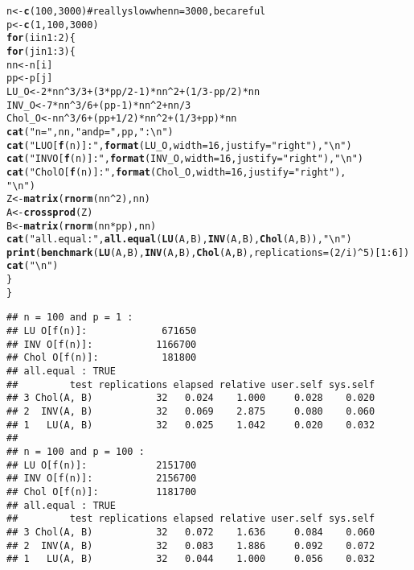 \documentclass{article}\usepackage{graphicx, color}
\makeatletter
\newcommand{\hlfunctioncall}[1]{\textcolor[rgb]{0.501960784313725,0,0.329411764705882}{\textbf{#1}}}%
\newcommand{\hlstring}[1]{\textcolor[rgb]{0.6,0.6,1}{#1}}%
\newcommand{\hlcomment}[1]{\textcolor[rgb]{0.180392156862745,0.6,0.341176470588235}{#1}}%
\newenvironment{kframe}{%
 \def\at@end@of@kframe{}%
 \ifinner\ifhmode%
  \def\at@end@of@kframe{\end{minipage}}%
  \begin{minipage}{\columnwidth}%
 \fi\fi%
 \def\FrameCommand##1{\hskip\@totalleftmargin \hskip-\fboxsep
 \colorbox{shadecolor}{##1}\hskip-\fboxsep
     \hskip-\linewidth \hskip-\@totalleftmargin \hskip\columnwidth}%
 \MakeFramed {\advance\hsize-\width
   \@totalleftmargin\z@ \linewidth\hsize
   \@setminipage}}%
 {\par\unskip\endMakeFramed%
 \at@end@of@kframe}
\newenvironment{knitrout}{}{} %
\makeatother
\begin{document}
\begin{knitrout}
\begin{kframe}
\begin{alltt}
n <- \hlfunctioncall{c}(100, 3000)  \hlcomment{# really slow when n=3000, be careful}
p <- \hlfunctioncall{c}(1, 100, 3000)
\hlfunctioncall{for} (i in 1:2) \{
    \hlfunctioncall{for} (j in 1:3) \{
        nn <- n[i]
        pp <- p[j]
        LU_O <- 2 * nn^3/3 + (3 * pp/2 - 1) * nn^2 + (1/3 - pp/2) * nn
        INV_O <- 7 * nn^3/6 + (pp - 1) * nn^2 + nn/3
        Chol_O <- nn^3/6 + (pp + 1/2) * nn^2 + (1/3 + pp) * nn
        \hlfunctioncall{cat}(\hlstring{"n ="}, nn, \hlstring{"and p ="}, pp, \hlstring{":\textbackslash{}n"})
        \hlfunctioncall{cat}(\hlstring{"LU O[\hlfunctioncall{f}(n)]:  "}, \hlfunctioncall{format}(LU_O, width = 16, justify = \hlstring{"right"}), \hlstring{"\textbackslash{}n"})
        \hlfunctioncall{cat}(\hlstring{"INV O[\hlfunctioncall{f}(n)]: "}, \hlfunctioncall{format}(INV_O, width = 16, justify = \hlstring{"right"}), \hlstring{"\textbackslash{}n"})
        \hlfunctioncall{cat}(\hlstring{"Chol O[\hlfunctioncall{f}(n)]:"}, \hlfunctioncall{format}(Chol_O, width = 16, justify = \hlstring{"right"}), 
            \hlstring{"\textbackslash{}n"})
        Z <- \hlfunctioncall{matrix}(\hlfunctioncall{rnorm}(nn^2), nn)
        A <- \hlfunctioncall{crossprod}(Z)
        B <- \hlfunctioncall{matrix}(\hlfunctioncall{rnorm}(nn * pp), nn)
        \hlfunctioncall{cat}(\hlstring{"all.equal :"}, \hlfunctioncall{all.equal}(\hlfunctioncall{LU}(A, B), \hlfunctioncall{INV}(A, B), \hlfunctioncall{Chol}(A, B)), \hlstring{"\textbackslash{}n"})
        \hlfunctioncall{print}(\hlfunctioncall{benchmark}(\hlfunctioncall{LU}(A, B), \hlfunctioncall{INV}(A, B), \hlfunctioncall{Chol}(A, B), replications = (2/i)^5)[1:6])
        \hlfunctioncall{cat}(\hlstring{"\textbackslash{}n"})
    \}
\}
\end{alltt}
\begin{verbatim}
## n = 100 and p = 1 :
## LU O[f(n)]:             671650 
## INV O[f(n)]:           1166700 
## Chol O[f(n)]:           181800 
## all.equal : TRUE 
##         test replications elapsed relative user.self sys.self
## 3 Chol(A, B)           32   0.024    1.000     0.028    0.020
## 2  INV(A, B)           32   0.069    2.875     0.080    0.060
## 1   LU(A, B)           32   0.025    1.042     0.020    0.032
## 
## n = 100 and p = 100 :
## LU O[f(n)]:            2151700 
## INV O[f(n)]:           2156700 
## Chol O[f(n)]:          1181700 
## all.equal : TRUE 
##         test replications elapsed relative user.self sys.self
## 3 Chol(A, B)           32   0.072    1.636     0.084    0.060
## 2  INV(A, B)           32   0.083    1.886     0.092    0.072
## 1   LU(A, B)           32   0.044    1.000     0.056    0.032

\end{verbatim}
\end{kframe}
\end{knitrout}
\end{document}
